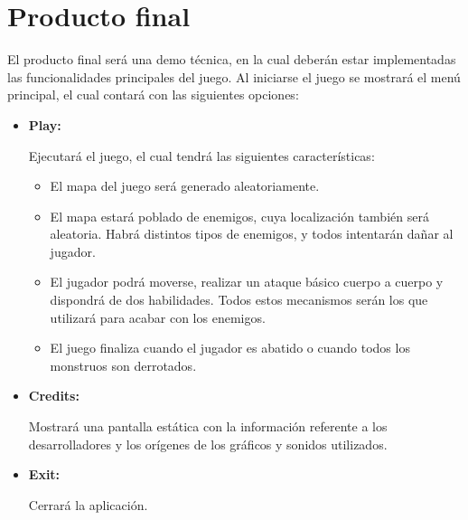 \chapter{Producto final}

El producto final será una demo técnica, en la cual deberán estar implementadas las 	funcionalidades principales del juego. Al iniciarse el juego se mostrará el menú principal, el 	cual contará con las siguientes opciones:

\begin{itemize}
	\item \textbf{Play:}

	Ejecutará el juego, el cual tendrá las siguientes características:

	\begin{itemize}
			\item El mapa del juego será generado aleatoriamente.
			\item El mapa estará poblado de enemigos, cuya localización también será aleatoria. Habrá distintos tipos de enemigos, y todos intentarán dañar al jugador.
			\item El jugador podrá moverse, realizar un ataque básico cuerpo a cuerpo y dispondrá de dos habilidades. Todos estos mecanismos serán los que utilizará para acabar con los enemigos.
			\item El juego finaliza cuando el jugador es abatido o cuando todos los monstruos son derrotados.
	\end{itemize}
	\item \textbf{Credits:}

	Mostrará una pantalla estática con la información referente a los desarrolladores y los orígenes de los gráficos y sonidos utilizados.

	\item \textbf{Exit:}

	Cerrará la aplicación.
\end{itemize}